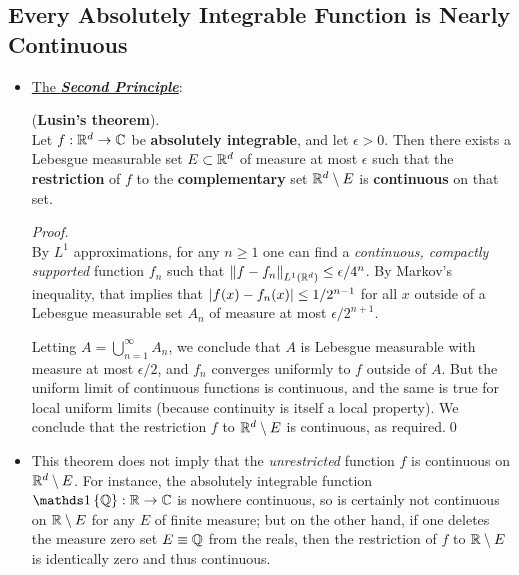 \documentclass[11pt]{article}
\begin{document}
\subsection{Every Absolutely Integrable Function is Nearly Continuous}
\begin{itemize}
\item \underline{The \textbf{\emph{Second Principle}}}: 
 \begin{theorem} (\textbf{Lusin's theorem}).\\
Let $f : {\mathbb R}^d \rightarrow {\mathbb C}$ be \textbf{absolutely integrable}, and let $\epsilon > 0$. Then there exists a Lebesgue measurable set $E \subset {\mathbb R}^d$ of measure at most $\epsilon$ such that the \textbf{restriction} of $f$ to the \textbf{complementary} set ${\mathbb R}^d \setminus E$ is \textbf{continuous} on that set. 
\end{theorem}
\begin{proof}  \citep{tao2011introduction}\\
By $L^{1}$ approximations, for any $n \ge 1$ one can find a \emph{continuous, compactly supported} function $f_n$ such that $\left\|f -f_n\right\|_{L^1({\mathbb R}^d)} \le \epsilon/4^{n}$. By Markov's inequality, that implies that $\left\lvert f(x) -f_n(x) \right\rvert\le 1/2^{n-1}$  for all $x$ outside of a Lebesgue measurable set $A_n$ of measure at most $\epsilon/2^{n+1}$. 

Letting $A = \bigcup_{n=1}^{\infty}A_{n}$, we conclude that $A$ is Lebesgue measurable with measure at most $\epsilon/2$, and $f_n$ converges uniformly to $f$ outside of $A$. But the uniform limit of continuous functions is continuous, and the same is true for local uniform limits (because continuity is itself a local property). We conclude that the restriction $f$ to ${\mathbb R}^{d} \setminus  E$ is continuous, as required.\qed 
\end{proof}

\item \begin{remark}
This theorem does not imply that the \emph{unrestricted} function $f$ is continuous on ${\mathbb R}^d \setminus  E$. For instance, the absolutely integrable function $\ind{\bQ} : \bR \rightarrow \bC$ is nowhere continuous, so is certainly not continuous
on ${\mathbb R} \setminus  E$ for any $E$ of finite measure; but on the other hand, if one deletes the measure zero set $E \equiv {\mathbb Q}$ from the reals, then the restriction of $f$ to ${\mathbb R} \setminus  E$ is identically zero and thus continuous. \citep{tao2011introduction}
\end{remark}


\end{itemize}
\end{document}
